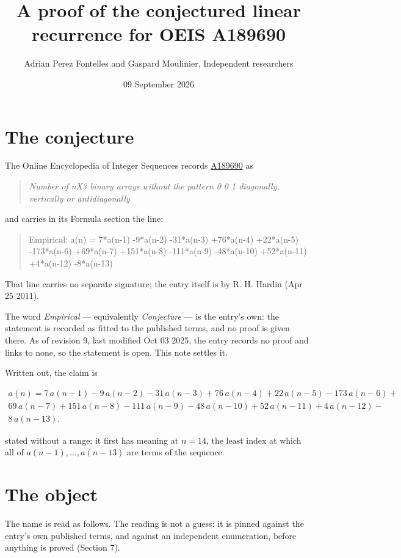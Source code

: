 \documentclass[11pt]{article}
\title{A proof of the conjectured linear recurrence for OEIS A189690}
\author{Adrian Perez Fontelles and Gaspard Moulinier, Independent researchers}
\date{09 September 2026}
\theoremstyle{definition}
\begin{document}
\maketitle
\section{The conjecture}

The Online Encyclopedia of Integer Sequences records \href{https://oeis.org/A189690}{A189690} as

\begin{quote}\itshape Number of nX3 binary arrays without the pattern 0 0 1 diagonally, vertically or antidiagonally\end{quote}

and carries in its Formula section the line:

\begin{quote}\ttfamily Empirical: a(n) = 7*a(n-1) -9*a(n-2) -31*a(n-3) +76*a(n-4) +22*a(n-5) -173*a(n-6) +69*a(n-7) +151*a(n-8) -111*a(n-9) -48*a(n-10) +52*a(n-11) +4*a(n-12) -8*a(n-13)\end{quote}

That line carries no separate signature; the entry itself is by R. H. Hardin (Apr 25 2011).

The word {\itshape Empirical} --- equivalently {\itshape Conjecture} --- is the entry's own: the statement is recorded as fitted to the published terms, and no proof is given there. As of revision 9, last modified Oct 03 2025, the entry records no proof and links to none, so the statement is open. This note settles it.

Written out, the claim is

\begin{multline*} a(n) = 7\,a(n-1) - 9\,a(n-2) - 31\,a(n-3) + 76\,a(n-4) + 22\,a(n-5) - 173\,a(n-6) + \\ 69\,a(n-7) + 151\,a(n-8) - 111\,a(n-9) - 48\,a(n-10) + 52\,a(n-11) + 4\,a(n-12) - \\ 8\,a(n-13). \end{multline*}

stated without a range; it first has meaning at $n = 14$, the least index at which all of $a(n-1),\dots,a(n-13)$ are terms of the sequence.

\section{The object}

The name is read as follows. The reading is not a guess: it is pinned against the entry's own published terms, and against an independent enumeration, before anything is proved (Section 7).
\end{document}
